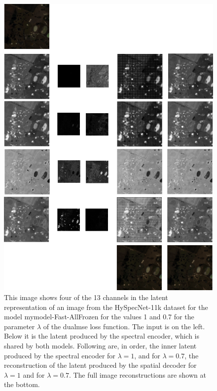 \begin{figure}
\centering
\includegraphics[scale=0.6]{img/latents_2.png}
\caption{This image shows four of the 13 channels in the latent representation of an image from the HySpecNet-11k dataset for the model \ac{mymodel}-Fast-AllFrozen for the values 1 and 0.7 for the parameter $\lambda$ of the \ac{dualmse} loss function. The input is on the left. Below it is the latent produced by the spectral encoder, which is shared by both models. Following are, in order, the inner latent produced by the spectral encoder for $\lambda=1$, and for  $\lambda=0.7$, the reconstruction of the latent produced by the spatial decoder for $\lambda=1$ and for $\lambda=0.7$. The full image reconstructions are shown at the bottom.}
\label{fig:latentcompare}
\end{figure}

